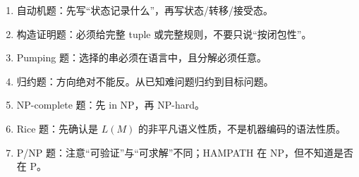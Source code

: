 ﻿\documentclass[UTF8,11pt]{ctexart}
\begin{document}
\begin{enumerate}
\item 自动机题：先写“状态记录什么”，再写状态/转移/接受态。
\item 构造证明题：必须给完整 tuple 或完整规则，不要只说“按闭包性”。
\item Pumping 题：选择的串必须在语言中，且分解必须任意。
\item 归约题：方向绝对不能反。从已知难问题归约到目标问题。
\item NP-complete 题：先 in NP，再 NP-hard。
\item Rice 题：先确认是 \(L(M)\) 的非平凡语义性质，不是机器编码的语法性质。
\item P/NP 题：注意“可验证”与“可求解”不同；HAMPATH 在 NP，但不知道是否在 P。
\end{enumerate}
\end{document}
